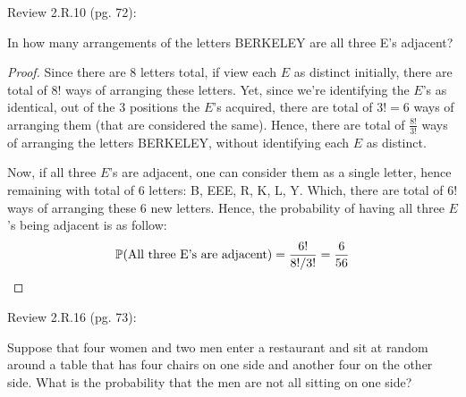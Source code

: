 \documentclass{article}
\begin{document}
\newpage

\begin{ques}\label{q8}
    Review 2.R.10 (pg. 72):

    In how many arrangements of the letters BERKELEY are all three E's adjacent?
\end{ques}

\begin{proof}
    Since there are $8$ letters total, if view each $E$ as distinct initially, there are total of $8!$ ways of arranging these letters. Yet, since we're identifying the $E$'s as identical, out of the $3$ positions the $E$'s acquired, there are total of $3!=6$ ways of arranging them (that are considered the same). Hence, there are total of $\frac{8!}{3!}$ ways of arranging the letters BERKELEY, without identifying each $E$ as distinct.

    \hfil

    Now, if all three $E$'s are adjacent, one can consider them as a single letter, hence remaining with total of $6$ letters: B, EEE, R, K, L, Y. Which, there are total of $6!$ ways of arranging these $6$ new letters. Hence, the probability of having all three $E$'s being adjacent is as follow:
    \begin{align}
        \mathbb{P}(\textmd{All three E's are adjacent})= \frac{6!}{8!/3!} = \frac{6}{56}
    \end{align}
\end{proof}

\hfil

\begin{ques}\label{q9}
    Review 2.R.16 (pg. 73):

    Suppose that four women and two men enter a restaurant and sit at random around a table that has four chairs on one side and another four on the other side. What is the probability that the men are not all sitting on one side?
\end{ques}
\end{document}
